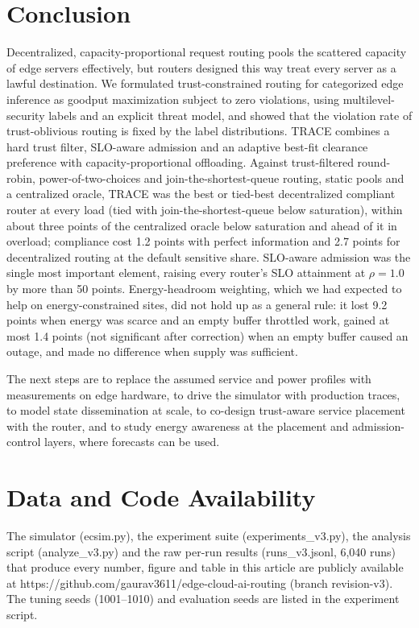 \documentclass[journal]{IEEEtran}
\begin{document}
\section{Conclusion}

Decentralized, capacity-proportional request routing pools the scattered capacity of edge servers effectively, but routers designed this way treat every server as a lawful destination. We formulated trust-constrained routing for categorized edge inference as goodput maximization subject to zero violations, using multilevel-security labels and an explicit threat model, and showed that the violation rate of trust-oblivious routing is fixed by the label distributions. TRACE combines a hard trust filter, SLO-aware admission and an adaptive best-fit clearance preference with capacity-proportional offloading. Against trust-filtered round-robin, power-of-two-choices and join-the-shortest-queue routing, static pools and a centralized oracle, TRACE was the best or tied-best decentralized compliant router at every load (tied with join-the-shortest-queue below saturation), within about three points of the centralized oracle below saturation and ahead of it in overload; compliance cost 1.2 points with perfect information and 2.7 points for decentralized routing at the default sensitive share. SLO-aware admission was the single most important element, raising every router's SLO attainment at \(\rho=1.0\) by more than 50 points. Energy-headroom weighting, which we had expected to help on energy-constrained sites, did not hold up as a general rule: it lost 9.2 points when energy was scarce and an empty buffer throttled work, gained at most 1.4 points (not significant after correction) when an empty buffer caused an outage, and made no difference when supply was sufficient.

The next steps are to replace the assumed service and power profiles with measurements on edge hardware, to drive the simulator with production traces, to model state dissemination at scale, to co-design trust-aware service placement with the router, and to study energy awareness at the placement and admission-control layers, where forecasts can be used.

\section*{Data and Code Availability}

The simulator (ecsim.py), the experiment suite (experiments\_v3.py), the analysis script (analyze\_v3.py) and the raw per-run results (runs\_v3.jsonl, 6,040 runs) that produce every number, figure and table in this article are publicly available at https://github.com/gaurav3611/edge-cloud-ai-routing (branch revision-v3). The tuning seeds (1001--1010) and evaluation seeds are listed in the experiment script.
\end{document}
